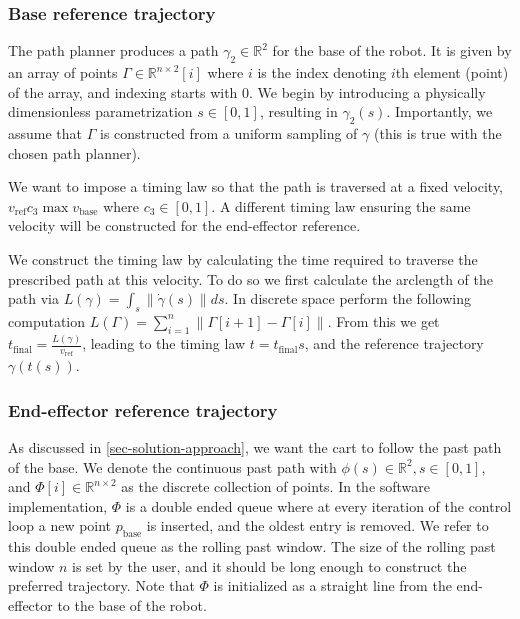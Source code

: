 \documentclass{article}
\begin{document}
\subsubsection{Base reference trajectory}
The path planner produces a path 
$ \gamma_{ 2 }  \in \mathbb{R}^{2} $ 
for the base of the robot.
It is given by an array of points $ \Gamma \in \mathbb{R}^{n \times 2} [i] $
where $ i  $ is the index denoting $ i  $th element (point) of the array,
and indexing starts with 0.
We begin by introducing a physically dimensionless parametrization 
$ s \in [0,1]  $, resulting in $ \gamma_{ 2 } (s)  $.
Importantly, we assume that $ \Gamma  $ is constructed
from a uniform sampling of $ \gamma  $ (this is true with the
chosen path planner).

We want to impose a timing law so that the path is traversed at a fixed
velocity, $ v_{ \text{ref} }  c_{ 3 } \max v_{ \text{base} }  $ 
where $ c_{ 3 } \in [0,1]  $.
A different timing law ensuring the same velocity will be constructed
for the end-effector reference.

We construct the timing law by calculating the time required
to traverse the prescribed path at this velocity.
To do so we first calculate the arclength of the path via
$ L (\gamma) = \int_{s}^{} \left\lVert    \dot{\gamma} (s)\right \rVert  ds  $.
In discrete space perform the following computation
$ L (\Gamma) =  \sum_{i=1}^{n} \left\lVert 
\Gamma [i+1] - \Gamma [i]  \right\rVert $.
From this we get 
$ t_{ \text{final} } = \frac{  L (\gamma) }{ v_{ \text{ref} }}  $,
leading to the timing law $ t = t_{ \text{final} } s  $,
and the reference trajectory $ \gamma (t (s))  $.

\subsubsection{End-effector reference trajectory}
As discussed in \ref{sec-solution-approach}, we want
the cart to follow the past path of the base.
We denote the continuous past path with 
$ \phi (s) \in \mathbb{R}^{2}, s \in [0,1]  $, and 
$ \Phi [i] \in \mathbb{R}^{n \times 2}  $ as the discrete collection of points.
In the software implementation, $ \Phi  $ is a double ended queue
where at every iteration of the control loop a new
point $ p_{ \text{base} }  $ is inserted, and the oldest
entry is removed. We refer to this double ended queue as the rolling past window.
The size of the rolling past window $ n  $ is set by the user,
and it should be long enough to construct the preferred trajectory.
Note that $ \Phi  $ is initialized as a straight line from the end-effector
to the base of the robot. 
\end{document}
